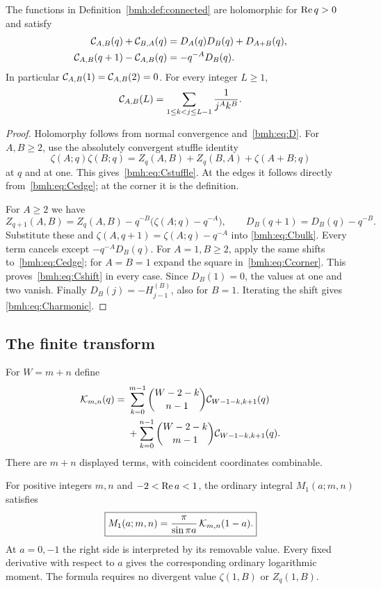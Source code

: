 \begin{lemma}
\label{bmh:lem:Cidentities}
The functions in Definition~\ref{bmh:def:connected} are holomorphic for
$\operatorname{Re} q>0$ and satisfy
\begin{align}
 \mathcal C_{A,B}(q)+\mathcal C_{B,A}(q)
 &=D_A(q)D_B(q)+D_{A+B}(q),\label{bmh:eq:Cstuffle}\\
 \mathcal C_{A,B}(q+1)-\mathcal C_{A,B}(q)
 &=-q^{-A}D_B(q).\label{bmh:eq:Cshift}
\end{align}
In particular $\mathcal C_{A,B}(1)=\mathcal C_{A,B}(2)=0$. For every integer $L\ge1$,
\begin{equation}\label{bmh:eq:Charmonic}
 \mathcal C_{A,B}(L)=\sum_{1\le k<j\le L-1}\frac1{j^A k^B}.
\end{equation}
\end{lemma}
\begin{proof}
Holomorphy follows from normal convergence and~\eqref{bmh:eq:D}.
For $A,B\ge2$, use the absolutely convergent stuffle identity
\[
 \zeta(A;q)\zeta(B;q)
 =Z_q(A,B)+Z_q(B,A)+\zeta(A+B;q)
\]
at $q$ and at one. This gives~\eqref{bmh:eq:Cstuffle}. At the edges it
follows directly from~\eqref{bmh:eq:Cedge}; at the corner it is the
definition.

For $A\ge2$ we have
\[
 Z_{q+1}(A,B)=Z_q(A,B)-q^{-B}\bigl(\zeta(A;q)-q^{-A}\bigr),
 \qquad D_B(q+1)=D_B(q)-q^{-B}.
\]
Substitute these and $\zeta(A,q+1)=\zeta(A;q)-q^{-A}$ into
\eqref{bmh:eq:Cbulk}. Every term cancels except $-q^{-A}D_B(q)$.
For $A=1,B\ge2$, apply the same shifts to~\eqref{bmh:eq:Cedge};
for $A=B=1$ expand the square in~\eqref{bmh:eq:Ccorner}.
This proves~\eqref{bmh:eq:Cshift} in every case. Since $D_B(1)=0$,
the values at one and two vanish. Finally
$D_B(j)=-H_{j-1}^{(B)}$, also for $B=1$. Iterating the shift gives
\eqref{bmh:eq:Charmonic}.
\end{proof}

\subsection{The finite transform}
For $W=m+n$ define
\begin{align}
 \mathcal K_{m,n}(q)={}&
 \sum_{k=0}^{m-1}\binom{W-2-k}{n-1}
       \mathcal C_{W-1-k,k+1}(q)\notag\\
 &+\sum_{k=0}^{n-1}\binom{W-2-k}{m-1}
       \mathcal C_{W-1-k,k+1}(q).
 \label{bmh:eq:K}
\end{align}
There are $m+n$ displayed terms, with coincident coordinates combinable.

\begin{theorem}
\label{bmh:thm:master}
For positive integers $m,n$ and $-2<\operatorname{Re} a<1$, the ordinary integral
$M_1(a;m,n)$ satisfies
\begin{equation}\label{bmh:eq:master}
 \boxed{\displaystyle
 M_1(a;m,n)=\frac{\pi}{\sin\pi a}\,\mathcal K_{m,n}(1-a).}
\end{equation}
At $a=0,-1$ the right side is interpreted by its removable value.
Every fixed derivative with respect to $a$ gives the corresponding
ordinary logarithmic moment. The formula requires no divergent value
$\zeta(1,B)$ or $Z_q(1,B)$.
\end{theorem}

